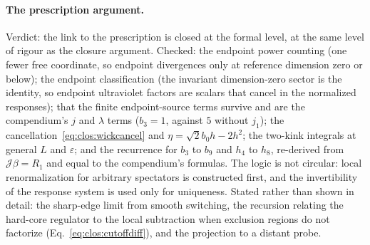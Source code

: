 \documentclass[11pt,a4paper]{article}
\numberwithin{equation}{section}
\begin{document}
\paragraph{The prescription argument.} Verdict: the link to the prescription is closed at the formal level, at the same
level of rigour as the closure argument. Checked: the endpoint power counting (one fewer free coordinate, so endpoint
divergences only at reference dimension zero or below); the endpoint classification (the invariant dimension-zero
sector is the identity, so endpoint ultraviolet factors are scalars that cancel in the normalized responses); that the
finite endpoint-source terms survive and are the compendium's $j$ and $\lambda$ terms ($b_3=1$, against $5$ without
$j_1$); the cancellation~\eqref{eq:clos:wickcancel} and $\eta=\sqrt2b_0h-2h^2$; the two-kink integrals at general $L$
and $\varepsilon$; and the recurrence for $b_3$ to $b_9$ and $h_4$ to $h_8$, re-derived from $\mathcal J\beta=R_1$ and
equal to the compendium's formulas. The logic is not circular: local renormalization for arbitrary spectators is
constructed first, and the invertibility of the response system is used only for uniqueness. Stated rather than shown
in detail: the sharp-edge limit from smooth switching, the recursion relating the hard-core regulator to the local
subtraction when exclusion regions do not factorize (Eq.~\eqref{eq:clos:cutoffdiff}), and the projection to a distant
probe.
\end{document}
